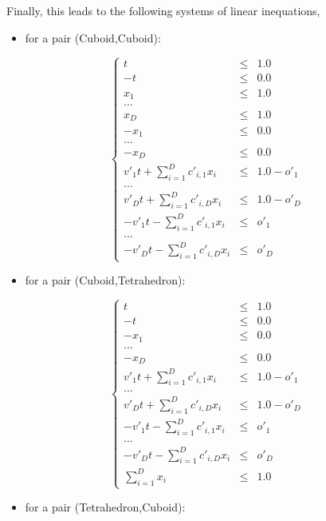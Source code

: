 \documentclass[12pt, a4paper]{article}
\begin{document}
Finally, this leads to the following systems of linear inequations,
\begin{itemize}
\item for a pair (Cuboid,Cuboid):
\end{itemize}
\begin{equation}
\left\lbrace
\begin{array}{rcl}
t&\le&1.0\\
-t&\le&0.0\\
x_1&\le&1.0\\
...\\
x_D&\le&1.0\\
-x_1&\le&0.0\\
...\\
-x_D&\le&0.0\\
v'_1t+\sum_{i=1}^Dc'_{i,1}x_i&\le&1.0-o'_1\\
...\\
v'_Dt+\sum_{i=1}^Dc'_{i,D}x_i&\le&1.0-o'_D\\
-v'_1t-\sum_{i=1}^Dc'_{i,1}x_i&\le&o'_1\\
...\\
-v'_Dt-\sum_{i=1}^Dc'_{i,D}x_i&\le&o'_D
\end{array}
\right.
\end{equation}
\begin{itemize}
\item for a pair (Cuboid,Tetrahedron):
\end{itemize}
\begin{equation}
\left\lbrace
\begin{array}{rcl}
t&\le&1.0\\
-t&\le&0.0\\
-x_1&\le&0.0\\
...\\
-x_D&\le&0.0\\
v'_1t+\sum_{i=1}^Dc'_{i,1}x_i&\le&1.0-o'_1\\
...\\
v'_Dt+\sum_{i=1}^Dc'_{i,D}x_i&\le&1.0-o'_D\\
-v'_1t-\sum_{i=1}^Dc'_{i,1}x_i&\le&o'_1\\
...\\
-v'_Dt-\sum_{i=1}^Dc'_{i,D}x_i&\le&o'_D\\
\sum_{i=1}^Dx_i&\le&1.0
\end{array}
\right.
\end{equation}
\begin{itemize}
\item for a pair (Tetrahedron,Cuboid):
\end{itemize}
\end{document}
